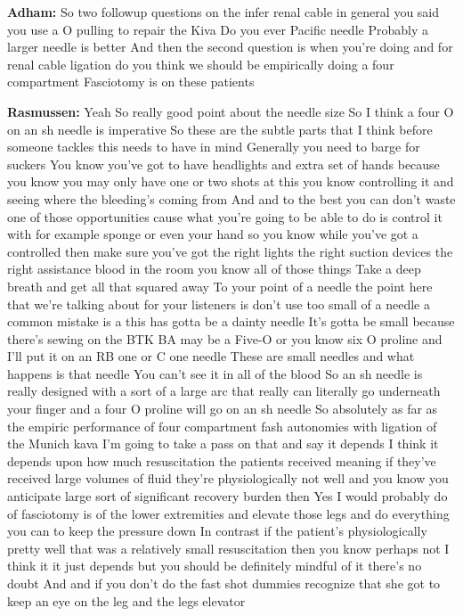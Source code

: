 \documentclass[
]{book}
\begin{document}
\textbf{Adham:} So two followup questions on the infer renal cable in general you said you use a O pulling to repair the Kiva Do you ever Pacific needle Probably a larger needle is better And then the second question is when you're doing and for renal cable ligation do you think we should be empirically doing a four compartment Fasciotomy is on these patients

\textbf{Rasmussen:} Yeah So really good point about the needle size So I think a four O on an sh needle is imperative So these are the subtle parts that I think before someone tackles this needs to have in mind Generally you need to barge for suckers You know you've got to have headlights and extra set of hands because you know you may only have one or two shots at this you know controlling it and seeing where the bleeding's coming from And and to the best you can don't waste one of those opportunities cause what you're going to be able to do is control it with for example sponge or even your hand so you know while you've got a controlled then make sure you've got the right lights the right suction devices the right assistance blood in the room you know all of those things Take a deep breath and get all that squared away To your point of a needle the point here that we're talking about for your listeners is don't use too small of a needle a common mistake is a this has gotta be a dainty needle It's gotta be small because there's sewing on the BTK BA may be a Five-O or you know six O proline and I'll put it on an RB one or C one needle These are small needles and what happens is that needle You can't see it in all of the blood So an sh needle is really designed with a sort of a large arc that really can literally go underneath your finger and a four O proline will go on an sh needle So absolutely as far as the empiric performance of four compartment fash autonomies with ligation of the Munich kava I'm going to take a pass on that and say it depends I think it depends upon how much resuscitation the patients received meaning if they've received large volumes of fluid they're physiologically not well and you know you anticipate large sort of significant recovery burden then Yes I would probably do of fasciotomy is of the lower extremities and elevate those legs and do everything you can to keep the pressure down In contrast if the patient's physiologically pretty well that was a relatively small resuscitation then you know perhaps not I think it it just depends but you should be definitely mindful of it there's no doubt And and if you don't do the fast shot dummies recognize that she got to keep an eye on the leg and the legs elevator
\end{document}
